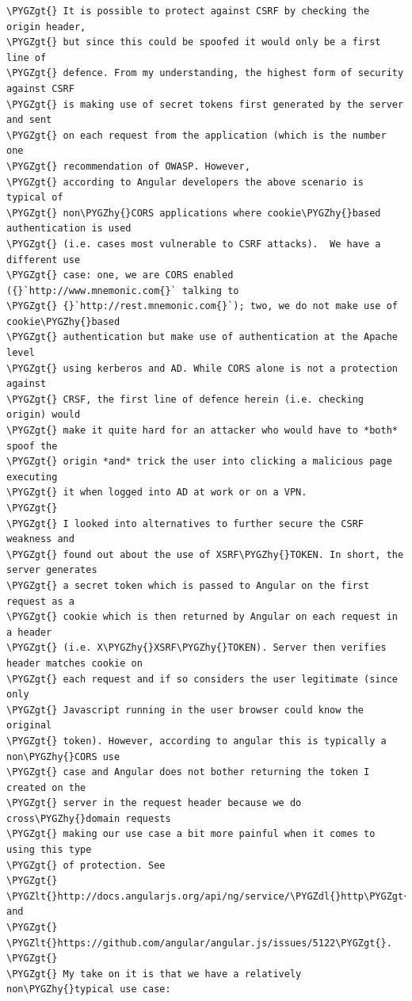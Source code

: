 \documentclass[letterpaper,10pt,english]{sphinxmanual}
\def\PYGZlt{\char`\<}
\def\PYGZgt{\char`\>}
\def\PYGZdl{\char`\$}
\def\PYGZhy{\char`\-}
\begin{document}
\begin{Verbatim}[commandchars=\\\{\}]
\PYGZgt{} It is possible to protect against CSRF by checking the origin header,
\PYGZgt{} but since this could be spoofed it would only be a first line of
\PYGZgt{} defence. From my understanding, the highest form of security against CSRF
\PYGZgt{} is making use of secret tokens first generated by the server and sent
\PYGZgt{} on each request from the application (which is the number one
\PYGZgt{} recommendation of OWASP. However,
\PYGZgt{} according to Angular developers the above scenario is typical of
\PYGZgt{} non\PYGZhy{}CORS applications where cookie\PYGZhy{}based authentication is used
\PYGZgt{} (i.e. cases most vulnerable to CSRF attacks).  We have a different use
\PYGZgt{} case: one, we are CORS enabled ({}`http://www.mnemonic.com{}` talking to
\PYGZgt{} {}`http://rest.mnemonic.com{}`); two, we do not make use of cookie\PYGZhy{}based
\PYGZgt{} authentication but make use of authentication at the Apache level
\PYGZgt{} using kerberos and AD. While CORS alone is not a protection against
\PYGZgt{} CRSF, the first line of defence herein (i.e. checking origin) would
\PYGZgt{} make it quite hard for an attacker who would have to *both* spoof the
\PYGZgt{} origin *and* trick the user into clicking a malicious page executing
\PYGZgt{} it when logged into AD at work or on a VPN.
\PYGZgt{}
\PYGZgt{} I looked into alternatives to further secure the CSRF weakness and
\PYGZgt{} found out about the use of XSRF\PYGZhy{}TOKEN. In short, the server generates
\PYGZgt{} a secret token which is passed to Angular on the first request as a
\PYGZgt{} cookie which is then returned by Angular on each request in a header
\PYGZgt{} (i.e. X\PYGZhy{}XSRF\PYGZhy{}TOKEN). Server then verifies header matches cookie on
\PYGZgt{} each request and if so considers the user legitimate (since only
\PYGZgt{} Javascript running in the user browser could know the original
\PYGZgt{} token). However, according to angular this is typically a non\PYGZhy{}CORS use
\PYGZgt{} case and Angular does not bother returning the token I created on the
\PYGZgt{} server in the request header because we do cross\PYGZhy{}domain requests
\PYGZgt{} making our use case a bit more painful when it comes to using this type
\PYGZgt{} of protection. See
\PYGZgt{} \PYGZlt{}http://docs.angularjs.org/api/ng/service/\PYGZdl{}http\PYGZgt{} and
\PYGZgt{} \PYGZlt{}https://github.com/angular/angular.js/issues/5122\PYGZgt{}.
\PYGZgt{}
\PYGZgt{} My take on it is that we have a relatively non\PYGZhy{}typical use case:

\end{Verbatim}
\end{document}
